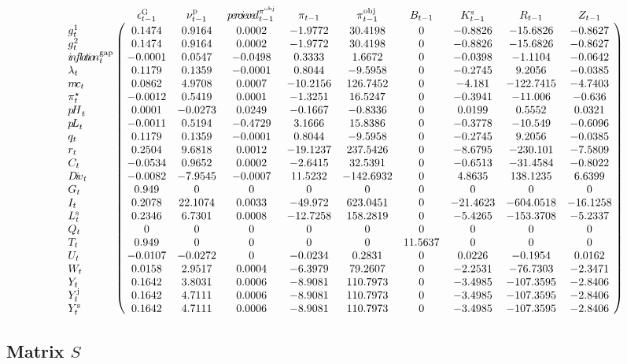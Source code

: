 $$\bordermatrix{
~ & \epsilon^{\mathrm{G}}_{t-1} & \nu^{\mathrm{p}}_{t-1} & {p\!e\!r\!c\!i\!e\!v\!e\!d}^{\pi^{\mathrm{obj}}}_{t-1} & \pi_{t-1} & \pi^{\mathrm{obj}}_{t-1} & B_{t-1} & K^{\mathrm{s}}_{t-1} & R_{t-1} & Z_{t-1} \cr
g^{\mathrm{1}}_{t} & 0.1474 & 0.9164 & 0.0002 & -1.9772 & 30.4198 & 0 & -0.8826 & -15.6826 & -0.8627 \cr
g^{\mathrm{2}}_{t} & 0.1474 & 0.9164 & 0.0002 & -1.9772 & 30.4198 & 0 & -0.8826 & -15.6826 & -0.8627 \cr
{i\!n\!f\!l\!a\!t\!i\!o\!n}^{\mathrm{gap}}_{t} & -0.0001 & 0.0547 & -0.0498 & 0.3333 & 1.6672 & 0 & -0.0398 & -1.1104 & -0.0642 \cr
\lambda_{t} & 0.1179 & 0.1359 & -0.0001 & 0.8044 & -9.5958 & 0 & -0.2745 & 9.2056 & -0.0385 \cr
{m\!c}_{t} & 0.0862 & 4.9708 & 0.0007 & -10.2156 & 126.7452 & 0 & -4.181 & -122.7415 & -4.7403 \cr
\pi^{\star}_{t} & -0.0012 & 0.5419 & 0.0001 & -1.3251 & 16.5247 & 0 & -0.3941 & -11.006 & -0.636 \cr
{p\!H}_{t} & 0.0001 & -0.0273 & 0.0249 & -0.1667 & -0.8336 & 0 & 0.0199 & 0.5552 & 0.0321 \cr
{p\!L}_{t} & -0.0011 & 0.5194 & -0.4729 & 3.1666 & 15.8386 & 0 & -0.3778 & -10.549 & -0.6096 \cr
q_{t} & 0.1179 & 0.1359 & -0.0001 & 0.8044 & -9.5958 & 0 & -0.2745 & 9.2056 & -0.0385 \cr
r_{t} & 0.2504 & 9.6818 & 0.0012 & -19.1237 & 237.5426 & 0 & -8.6795 & -230.101 & -7.5809 \cr
C_{t} & -0.0534 & 0.9652 & 0.0002 & -2.6415 & 32.5391 & 0 & -0.6513 & -31.4584 & -0.8022 \cr
{D\!i\!v}_{t} & -0.0082 & -7.9545 & -0.0007 & 11.5232 & -142.6932 & 0 & 4.8635 & 138.1235 & 6.6399 \cr
G_{t} & 0.949 & 0 & 0 & 0 & 0 & 0 & 0 & 0 & 0 \cr
I_{t} & 0.2078 & 22.1074 & 0.0033 & -49.972 & 623.0451 & 0 & -21.4623 & -604.0518 & -16.1258 \cr
L^{\mathrm{s}}_{t} & 0.2346 & 6.7301 & 0.0008 & -12.7258 & 158.2819 & 0 & -5.4265 & -153.3708 & -5.2337 \cr
Q_{t} & 0 & 0 & 0 & 0 & 0 & 0 & 0 & 0 & 0 \cr
T_{t} & 0.949 & 0 & 0 & 0 & 0 & 11.5637 & 0 & 0 & 0 \cr
U_{t} & -0.0107 & -0.0272 & 0 & -0.0234 & 0.2831 & 0 & 0.0226 & -0.1954 & 0.0162 \cr
W_{t} & 0.0158 & 2.9517 & 0.0004 & -6.3979 & 79.2607 & 0 & -2.2531 & -76.7303 & -2.3471 \cr
Y_{t} & 0.1642 & 3.8031 & 0.0006 & -8.9081 & 110.7973 & 0 & -3.4985 & -107.3595 & -2.8406 \cr
Y^{\mathrm{j}}_{t} & 0.1642 & 4.7111 & 0.0006 & -8.9081 & 110.7973 & 0 & -3.4985 & -107.3595 & -2.8406 \cr
Y^{\mathrm{s}}_{t} & 0.1642 & 4.7111 & 0.0006 & -8.9081 & 110.7973 & 0 & -3.4985 & -107.3595 & -2.8406 \cr
}$$

\subsection*{Matrix $S$}

